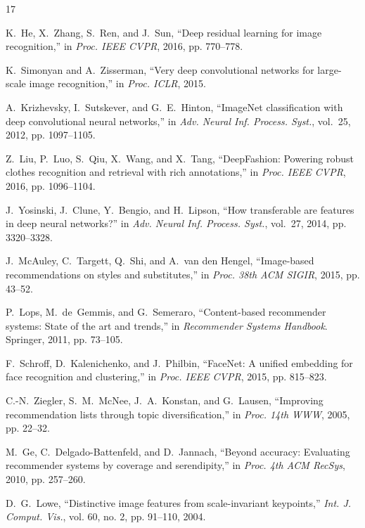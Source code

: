 \documentclass[conference]{IEEEtran}
\begin{document}
\begin{thebibliography}{17}

K.~He, X.~Zhang, S.~Ren, and J.~Sun,
``Deep residual learning for image recognition,''
in \emph{Proc. IEEE CVPR}, 2016, pp. 770--778.

K.~Simonyan and A.~Zisserman,
``Very deep convolutional networks for large-scale image recognition,''
in \emph{Proc. ICLR}, 2015.

A.~Krizhevsky, I.~Sutskever, and G.~E.~Hinton,
``ImageNet classification with deep convolutional neural networks,''
in \emph{Adv. Neural Inf. Process. Syst.}, vol.~25, 2012, pp. 1097--1105.

Z.~Liu, P.~Luo, S.~Qiu, X.~Wang, and X.~Tang,
``DeepFashion: Powering robust clothes recognition and retrieval with
rich annotations,''
in \emph{Proc. IEEE CVPR}, 2016, pp. 1096--1104.

J.~Yosinski, J.~Clune, Y.~Bengio, and H.~Lipson,
``How transferable are features in deep neural networks?''
in \emph{Adv. Neural Inf. Process. Syst.}, vol.~27, 2014, pp. 3320--3328.

J.~McAuley, C.~Targett, Q.~Shi, and A.~van den Hengel,
``Image-based recommendations on styles and substitutes,''
in \emph{Proc. 38th ACM SIGIR}, 2015, pp. 43--52.

P.~Lops, M.~de~Gemmis, and G.~Semeraro,
``Content-based recommender systems: State of the art and trends,''
in \emph{Recommender Systems Handbook}. Springer, 2011, pp. 73--105.

F.~Schroff, D.~Kalenichenko, and J.~Philbin,
``FaceNet: A unified embedding for face recognition and clustering,''
in \emph{Proc. IEEE CVPR}, 2015, pp. 815--823.

C.-N.~Ziegler, S.~M.~McNee, J.~A.~Konstan, and G.~Lausen,
``Improving recommendation lists through topic diversification,''
in \emph{Proc. 14th WWW}, 2005, pp. 22--32.

M.~Ge, C.~Delgado-Battenfeld, and D.~Jannach,
``Beyond accuracy: Evaluating recommender systems by coverage and
serendipity,''
in \emph{Proc. 4th ACM RecSys}, 2010, pp. 257--260.

D.~G.~Lowe,
``Distinctive image features from scale-invariant keypoints,''
\emph{Int. J. Comput. Vis.}, vol. 60, no. 2, pp. 91--110, 2004.


\end{thebibliography}
\end{document}
